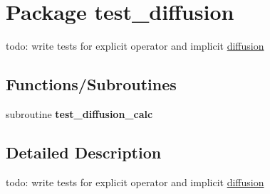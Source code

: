 \hypertarget{a00039}{
\section{Package test\_\-diffusion}
\label{a00039}
}
todo: write tests for explicit operator and implicit \hyperlink{a00027}{diffusion}  


\subsection*{Functions/Subroutines}
\begin{CompactItemize}
\item 
\hypertarget{a00039_d1b9667edb89549205379f91432b9da3}{
subroutine \textbf{test\_\-diffusion\_\-calc}}
\label{a00039_d1b9667edb89549205379f91432b9da3}

\end{CompactItemize}


\subsection{Detailed Description}
todo: write tests for explicit operator and implicit \hyperlink{a00027}{diffusion} 

